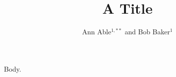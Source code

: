 \documentclass{revtex4-2}
\begin{document}
\title{A Title}
\author{Ann Able$^{1,**}$ and Bob Baker$^{1}$}
\maketitle
Body.
\end{document}
